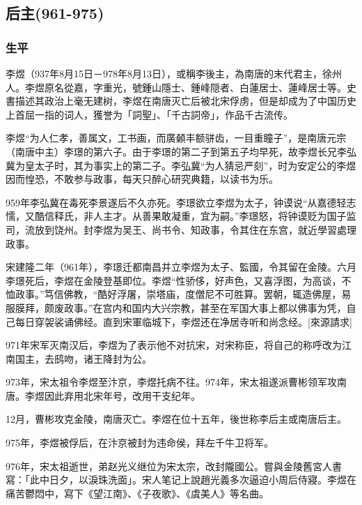 
\subsection{后主\tiny(961-975)}

\subsubsection{生平}

李煜（937年8月15日－978年8月13日），或稱李後主，為南唐的末代君主，徐州人。李煜原名從嘉，字重光，號鍾山隱士、鍾峰隠者、白蓮居士、蓮峰居士等。史書描述其政治上毫无建树，李煜在南唐灭亡后被北宋俘虏，但是却成为了中国历史上首屈一指的词人，獲誉为「詞聖」、「千古詞帝」，作品千古流传。

李煜“为人仁孝，善属文，工书画，而廣顙丰额骈齿，一目重瞳子”，是南唐元宗（南唐中主）李璟的第六子。由于李璟的第二子到第五子均早死，故李煜长兄李弘冀为皇太子时，其为事实上的第二子。李弘冀“为人猜忌严刻”，时为安定公的李煜因而惶恐，不敢参与政事，每天只醉心研究典籍，以读书为乐。

959年李弘冀在毒死李景遂后不久亦死。李璟欲立李煜为太子，钟谟说“从嘉德轻志懦，又酷信释氏，非人主才。从善果敢凝重，宜为嗣。”李璟怒，将钟谟贬为国子监司，流放到饶州。封李煜为吴王、尚书令、知政事，令其住在东宫，就近學習處理政事。

宋建隆二年（961年），李璟迁都南昌并立李煜为太子、監國，令其留在金陵。六月李璟死后，李煜在金陵登基即位。李煜“性骄侈，好声色，又喜浮图，为高谈，不恤政事。”笃信佛教，“酷好浮屠，崇塔庙，度僧尼不可胜算。罢朝，辄造佛屋，易服膜拜，颇废政事。”在宫内和国内大兴宗教，甚至在军国大事上都以佛事为凭，自己每日穿袈裟诵佛经。直到宋軍临城下，李煜还在净居寺听和尚念经。[來源請求]

971年宋军灭南汉后，李煜为了表示他不对抗宋，对宋称臣，将自己的称呼改为江南国主，去鸱吻，诸王降封为公。

973年，宋太祖令李煜至汴京，李煜托病不往。974年，宋太祖遂派曹彬领军攻南唐。李煜因此弃用北宋年号，改用干支纪年。

12月，曹彬攻克金陵，南唐灭亡。李煜在位十五年，後世称李后主或南唐后主。

975年，李煜被俘后，在汴京被封为违命侯，拜左千牛卫将军。

976年，宋太祖逝世，弟赵光义继位为宋太宗，改封隴國公。嘗與金陵舊宮人書寫：「此中日夕，以淚珠洗面」。宋人笔记上說趙光義多次逼迫小周后侍寢。李煜在痛苦鬱悶中，寫下《望江南》、《子夜歌》、《虞美人》等名曲。

